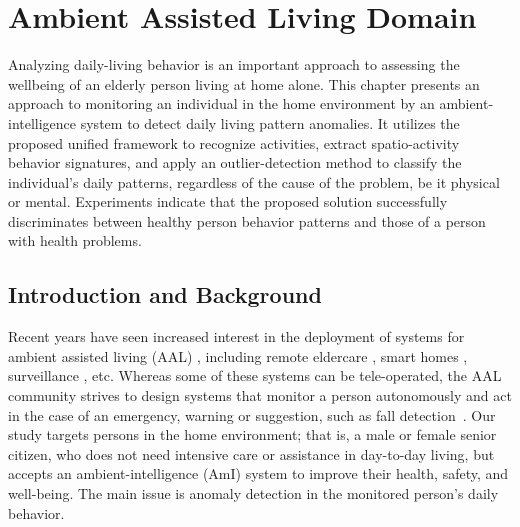 

%
%
\chapter{Ambient Assisted Living Domain}
\label{chap:confidence}

Analyzing  daily-living behavior is an important approach to assessing the wellbeing of an elderly person living at home alone. This chapter presents an approach to monitoring an individual in the home environment by an ambient-intelligence system to detect daily living pattern anomalies. It utilizes the proposed unified framework to recognize activities, extract spatio-activity behavior signatures, and apply an outlier-detection method to classify the individual's daily patterns, regardless of the cause of the problem, be it physical or mental. Experiments indicate that the proposed solution successfully discriminates between healthy person behavior patterns and those of a person with health problems.

\section{Introduction and Background}
\label{sec:introduction}

%
%
Recent years have seen increased interest in the deployment of systems for ambient assisted living (AAL) \citep{Augusto2012}, including remote eldercare \citep{Kaluza2010Agentbased}, smart homes \citep{Cook}, surveillance \citep{Dore}, etc. Whereas some of these systems can be tele-operated, the AAL community strives to design systems that monitor a person autonomously and act in the case of an emergency, warning or suggestion, such as fall detection~\citep{Bourke, Lustrek2009Behavior}. Our study targets persons in the home environment; that is, a male or female senior citizen, who does not need intensive care or assistance in day-to-day living, but accepts an ambient-intelligence (AmI) system to improve their health, safety, and well-being. The main issue is anomaly detection in the monitored person's daily behavior.

